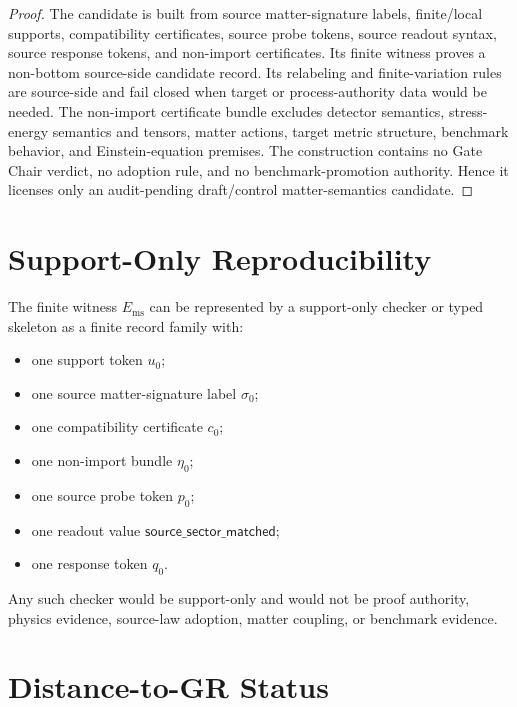 \documentclass[11pt]{article}
\begin{document}
\begin{proof}
The candidate is built from source matter-signature labels, finite/local
supports, compatibility certificates, source probe tokens, source readout
syntax, source response tokens, and non-import certificates. Its finite
witness proves a non-bottom source-side candidate record. Its relabeling and
finite-variation rules are source-side and fail closed when target or
process-authority data would be needed. The non-import certificate bundle
excludes detector semantics, stress-energy semantics and tensors, matter
actions, target metric structure, benchmark behavior, and Einstein-equation
premises. The construction contains no Gate Chair verdict, no adoption rule,
and no benchmark-promotion authority. Hence it licenses only an audit-pending
draft/control matter-semantics candidate.
\end{proof}

\section{Support-Only Reproducibility}

The finite witness \(E_{\mathrm{ms}}\) can be represented by a support-only
checker or typed skeleton as a finite record family with:
\begin{itemize}[leftmargin=*]
\item one support token \(u_0\);
\item one source matter-signature label \(\sigma_0\);
\item one compatibility certificate \(c_0\);
\item one non-import bundle \(\eta_0\);
\item one source probe token \(p_0\);
\item one readout value \(\mathsf{source\_sector\_matched}\);
\item one response token \(q_0\).
\end{itemize}
Any such checker would be support-only and would not be proof authority,
physics evidence, source-law adoption, matter coupling, or benchmark evidence.

\section{Distance-to-GR Status}
\end{document}
